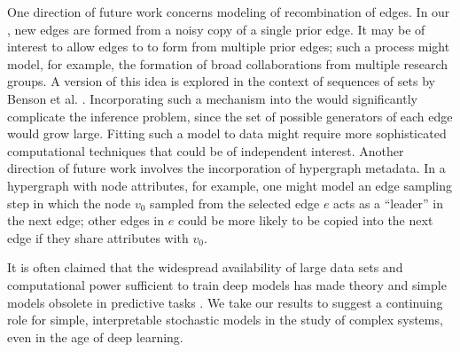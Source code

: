     One direction of future work concerns modeling of recombination of edges. 
    In our \model, new edges are formed from a noisy copy of a single prior edge. 
    It may be of interest to allow edges to to form from multiple prior edges; such a process might model, for example, the formation of broad collaborations from multiple research groups. 
    A version of this idea is explored in the context of sequences of sets by   Benson et al. \cite{bensonSequencesSets2018}. 
    Incorporating such a mechanism into the \model would significantly complicate the inference problem, since the set of possible generators of each edge would grow large. 
    Fitting such a model to data might require more sophisticated computational techniques that could be of independent interest. 
    Another direction of future work involves the incorporation of hypergraph metadata. 
    In a hypergraph with node attributes, for example, one might model an edge sampling step in which the node $v_0$ sampled from the selected edge $e$ acts as a ``leader'' in the next edge; other edges in $e$ could be more likely to be copied into the next edge if they share attributes with $v_0$.
    
    
    
    It is often claimed that the widespread availability of large data sets and computational power sufficient to train deep models has made theory and simple models obsolete in predictive tasks \cite{anderson2008end}.
    We take our results to suggest a continuing role for simple, interpretable stochastic models in the study of complex systems, even in the age of deep learning. 



